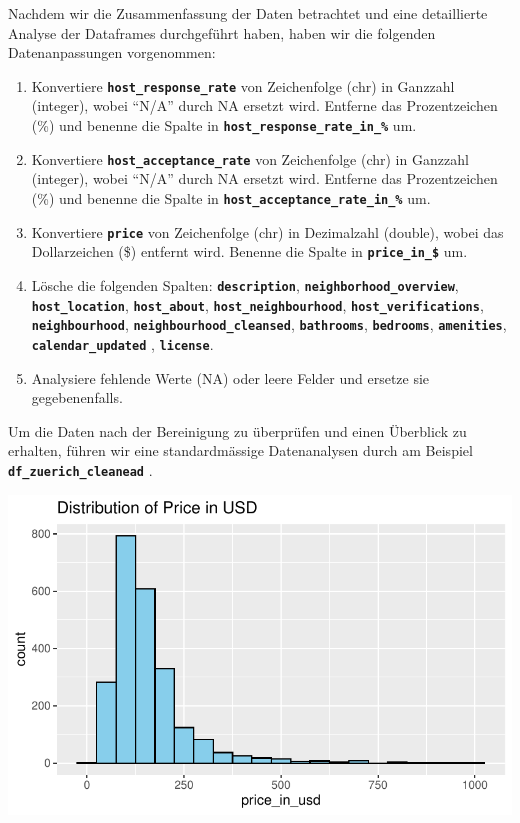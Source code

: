 \documentclass[
  journal,
]{IEEEtran}%
\begin{document}
Nachdem wir die Zusammenfassung der Daten betrachtet und eine
detaillierte Analyse der Dataframes durchgeführt haben, haben wir die
folgenden Datenanpassungen vorgenommen:

\begin{enumerate}
\def\labelenumi{\arabic{enumi}.}
\item
  Konvertiere \textbf{\texttt{host\_response\_rate}} von Zeichenfolge
  (chr) in Ganzzahl (integer), wobei ``N/A'' durch NA ersetzt wird.
  Entferne das Prozentzeichen (\%) und benenne die Spalte in
  \textbf{\texttt{host\_response\_rate\_in\_\%}} um.
\item
  Konvertiere \textbf{\texttt{host\_acceptance\_rate}} von Zeichenfolge
  (chr) in Ganzzahl (integer), wobei ``N/A'' durch NA ersetzt wird.
  Entferne das Prozentzeichen (\%) und benenne die Spalte in
  \textbf{\texttt{host\_acceptance\_rate\_in\_\%}} um.
\item
  Konvertiere \textbf{\texttt{price}} von Zeichenfolge (chr) in
  Dezimalzahl (double), wobei das Dollarzeichen (\$) entfernt wird.
  Benenne die Spalte in \textbf{\texttt{price\_in\_\$}} um.
\item
  Lösche die folgenden Spalten: \textbf{\texttt{description}},
  \textbf{\texttt{neighborhood\_overview}},
  \textbf{\texttt{host\_location}}, \textbf{\texttt{host\_about}},
  \textbf{\texttt{host\_neighbourhood}},
  \textbf{\texttt{host\_verifications}},
  \textbf{\texttt{neighbourhood}},
  \textbf{\texttt{neighbourhood\_cleansed}},
  \textbf{\texttt{bathrooms}}, \textbf{\texttt{bedrooms}},
  \textbf{\texttt{amenities}}, \textbf{\texttt{calendar\_updated}} ,
  \textbf{\texttt{license}}.
\item
  Analysiere fehlende Werte (NA) oder leere Felder und ersetze sie
  gegebenenfalls.
\end{enumerate}

Um die Daten nach der Bereinigung zu überprüfen und einen Überblick zu
erhalten, führen wir eine standardmässige Datenanalysen durch am
Beispiel \textbf{\texttt{df\_zuerich\_cleanead}} .

\includegraphics{main_files/figure-pdf/eda-1.pdf}
\end{document}
